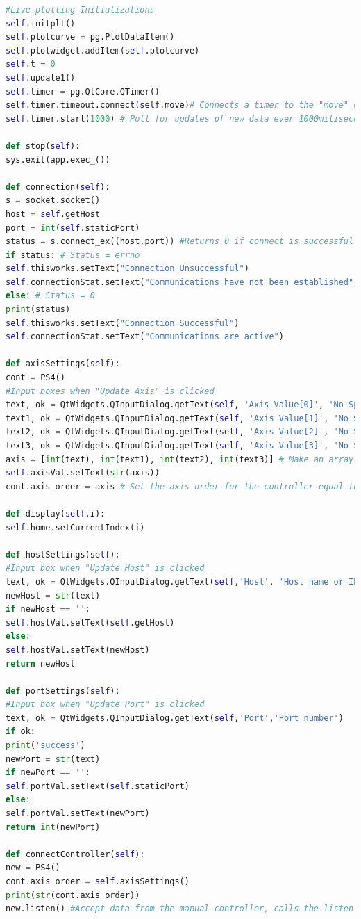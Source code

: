 \begin{lstlisting}[language=Python,caption={GUI.py},label={lst:GUI.py}]
#Live plotting Initializations
self.initplt()
self.plotcurve = pg.PlotDataItem()
self.plotwidget.addItem(self.plotcurve)
self.t = 0
self.update1()
self.timer = pg.QtCore.QTimer()
self.timer.timeout.connect(self.move)# Connects a timer to the "move" definition that allows for live plotting
self.timer.start(1000) # Poll for updates of new data ever 1000miliseconds (1 second)

def stop(self):
sys.exit(app.exec_())

def connection(self):
s = socket.socket()
host = self.getHost
port = int(self.staticPort)
status = s.connect_ex((host,port)) #Returns 0 if connect is successful, returns errno if not
if status: # Status = errno
self.thisworks.setText("Connection Unsuccessful")
self.connectionStat.setText("Communications have not been established")
else: # Status = 0
print(status)
self.thisworks.setText("Connection Successful")
self.connectionStat.setText("Communications are active")

def axisSettings(self):
cont = PS4()
#Input boxes when "Update Axis" is clicked
text, ok = QtWidgets.QInputDialog.getText(self, 'Axis Value[0]', 'No Spaces')
text1, ok = QtWidgets.QInputDialog.getText(self, 'Axis Value[1]', 'No Spaces')
text2, ok = QtWidgets.QInputDialog.getText(self, 'Axis Value[2]', 'No Spaces')
text3, ok = QtWidgets.QInputDialog.getText(self, 'Axis Value[3]', 'No Spaces')
axis = [int(text), int(text1), int(text2), int(text3)] # Make an array of the values from the input dialogs
self.axisVal.setText(str(axis)) 
cont.axis_order = axis # Set the axis order for the controller equal to the new settings

def display(self,i):
self.home.setCurrentIndex(i)

def hostSettings(self):
#Input box when "Update Host" is clicked
text, ok = QtWidgets.QInputDialog.getText(self,'Host', 'Host name or IP address')
newHost = str(text)
if newHost == '':
self.hostVal.setText(self.getHost)
else:
self.hostVal.setText(newHost)
return newHost

def portSettings(self):
#Input box when "Update Port" is clicked
text, ok = QtWidgets.QInputDialog.getText(self,'Port','Port number')
if ok:
print('success')
newPort = str(text)
if newPort == '':
self.portVal.setText(self.staticPort)
else:
self.portVal.setText(newPort)     
return int(newPort)

def connectController(self):
new = PS4()
cont.axis_order = self.axisSettings()
print(str(cont.axis_order))
new.listen() #Accept data from the manual controller, calls the listen definition from PS4Controller.py


\end{lstlisting}
